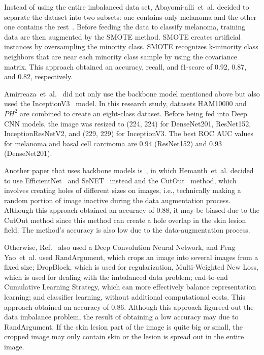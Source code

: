 \documentclass[sensors,article,accept,pdftex,moreauthors]{Definitions/mdpi}
\begin{document}
{		Instead of using the entire imbalanced data set, Abayomi-alli~et~al. decided to separate the dataset into two subsets: one contains only melanoma and the other one contains the rest~\mbox{\cite{2101.133}}. Before feeding the data to classify  melanoma, training data are then augmented by the SMOTE method. SMOTE creates artificial instances by oversampling the minority class. SMOTE recognizes k-minority class neighbors that are near  each minority class sample by using the covariance matrix. This approach obtained an accuracy, recall, and f1-score of 0.92, 0.87, and 0.82, respectively.
		
		Amirreaza~et~al.~\mbox{\cite{10348}} did not only use the backbone model mentioned above but also used the InceptionV3~\mbox{\cite{00567}} model. In this research study,  datasets HAM10000 and $PH^2$ are combined to create an eight-class dataset. Before being fed into  Deep CNN models, the image was resized to (224, 224) for DenseNet201, ResNet152, InceptionResNetV2, and (229, 229) for InceptionV3. The best ROC AUC values for melanoma and basal cell carcinoma are 0.94 (ResNet152) and 0.93 (DenseNet201).
		
		Another paper that uses  backbone models is~\mbox{\cite{09418}},  in which Hemanth~et~al. decided to use EfficientNet~\mbox{\cite{11946}} and SeNET~\mbox{\cite{01507}} instead and the CutOut~\mbox{\cite{04552v2}} method, which involves creating holes of different sizes on  images, i.e., technically making a random portion of image inactive during the data augmentation process. Although this approach obtained an accuracy of 0.88, it may be biased due to the CutOut method since this method can create a hole overlap in the skin lesion field. The method's accuracy is also low due to the data-augmentation process. 
		
		Otherwise, Ref.~\mbox{\cite{01284}} also used a Deep Convolution Neural Network, and Peng Yao~et~al. used RandArgument, which crops an image into several images from a fixed size; DropBlock, which is used for regularization, Multi-Weighted New Loss, which is used for dealing with the imbalanced data problem; end-to-end Cumulative Learning Strategy, which can more effectively balance representation learning; and classifier learning, without additional computational costs. This approach obtained an accuracy of 0.86. Although this approach figureed out the data imbalance problem, the result of obtaining a low accuracy may due to  RandArgument. If the skin lesion part of the image is quite big or  small, the cropped image may only contain  skin or the lesion is spread out in the entire image.
		
}
\end{document}
